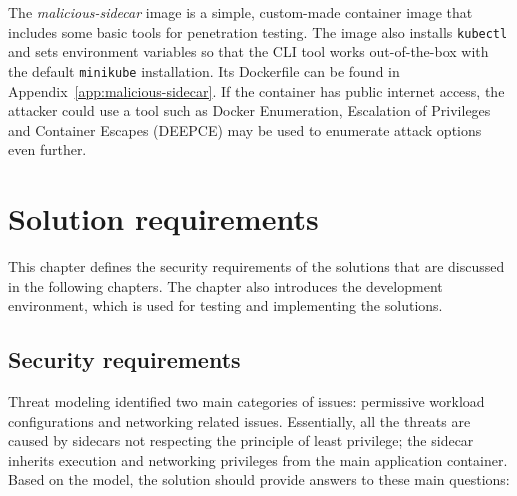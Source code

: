 \documentclass[english, 12pt, a4paper, sci, utf8, a-2b, online]{aaltothesis}
\begin{document}
The \emph{malicious-sidecar} image is a simple, custom-made container image that includes some basic tools for penetration testing.
The image also installs \texttt{kubectl} and sets environment variables so that the CLI tool works out-of-the-box with the default \texttt{minikube} installation.
Its Dockerfile can be found in Appendix~\ref{app:malicious-sidecar}. If the container has public internet access, the attacker could use a tool such as Docker Enumeration, Escalation of Privileges and Container Escapes (DEEPCE) \cite{deepce} may be used to enumerate attack options even further.

\clearpage

\section{Solution requirements} \label{sec:methods}

This chapter defines the security requirements of the solutions that are discussed in the following chapters. The chapter also introduces the development environment, which is used for testing and implementing the solutions.

\subsection{Security requirements}

Threat modeling identified two main categories of issues: permissive workload configurations and networking related issues.
Essentially, all the threats are caused by sidecars not respecting the principle of least privilege; the sidecar inherits execution and networking privileges from the main application container.
Based on the model, the solution should provide answers to these main questions:

\end{document}
